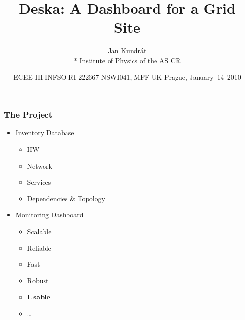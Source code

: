 \documentclass{beamer}
\begin{document}
\title{Deska: A Dashboard for a Grid Site}
\author{Jan Kundrát\\*
Institute of Physics of the AS CR}
\date{
   {EGEE-III INFSO-RI-222667}  
\hfill
NSWI041, MFF UK Prague, January~14~2010
}
\begin{frame}
\maketitle
\end{frame}


\begin{frame}[fragile]
\frametitle{The Project}

\begin{itemize}
    \item Inventory Database
        \begin{itemize}
            \item HW
            \item Network
            \item Services
            \item Dependencies \& Topology
        \end{itemize}
    \item Monitoring Dashboard
        \begin{itemize}
            \item Scalable
            \item Reliable
            \item Fast
            \item Robust
            \item {\bf Usable}
            \item \ldots
        \end{itemize}
\end{itemize}
\end{frame}
\end{document}
